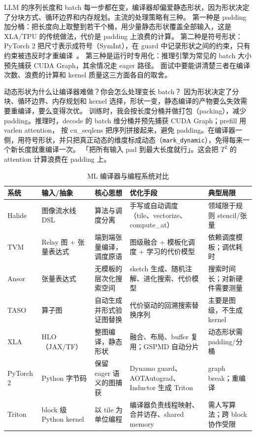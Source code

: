 LLM 的序列长度和 batch 每一步都在变，编译器却偏爱静态形状，因为形状决定了分块方式、循环边界和内存规划。主流的处理策略有三种。
第一种是 padding 加分桶：把长度向上取整到若干个桶，用少量静态形状覆盖全部输入，这是 XLA/TPU 的传统做法，代价是 padding 上浪费的计算。
第二种是符号形状：PyTorch 2 把尺寸表示成符号（SymInt），在 guard 中记录形状之间的约束，只有约束被违反时才重编译~\cite{ansel2024pytorch2}。
第三种是运行时专用化：推理引擎为常见的 batch 大小预先捕获 CUDA Graph，其余情况走 eager 路径。
面试中要能讲清楚三者在编译次数、浪费的计算和 kernel 质量这三方面各自的取舍。

\begin{qa}{动态形状为什么让编译器难做？你会怎么处理变长 batch？}
\ans 因为形状决定了分块、循环边界、内存规划和 kernel 选择，形状一变，静态编译的产物要么失效需要重编译，要么变得次优。
训练时，我会按长度分桶并做打包（packing），减少 padding。推理时，decode 的 batch 维分桶并预先捕获 CUDA Graph；prefill 用 varlen attention，
按 cu\_seqlens 把序列拼接起来，避免 padding。在编译器一侧，用符号形状，并只把真正动态的维度标成动态（\texttt{mark\_dynamic}），免得每来一个新长度就重编译一次。
\wrong 「把所有输入 pad 到最大长度就行」。这会把 $T^2$ 的 attention 计算浪费在 padding 上。
\end{qa}

\begin{table}[!t]
\centering
\caption{ML 编译器与编程系统对比}
\label{tab:compilers}
\footnotesize
\begin{tabularx}{\textwidth}{@{}l L{2.6cm} L{3.2cm} Y Y@{}}
\toprule
系统 & 输入/抽象 & 核心思想 & 优化手段 & 典型局限 \\
\midrule
Halide~\cite{ragan2013halide} & 图像流水线 DSL & 算法与调度分离 & 手写或自动调度（tile、vectorize、compute\_at） & 领域限于规则 stencil/张量 \\
TVM~\cite{chen2018tvm} & Relay 图 + 张量表达式 & 端到端张量编译，调度原语 & 图级融合 + 模板化调度 + 学习的代价模型 & 依赖调度模板；调优耗时 \\
Ansor~\cite{zheng2020ansor} & 张量表达式 & 无模板的层次化搜索空间 & sketch 生成、随机注解、进化搜索、代价模型 & 搜索时间长；对新硬件需要测量 \\
TASO~\cite{jia2019taso} & 算子图 & 自动生成并形式验证图替换 & 代价驱动的回溯搜索替换序列 & 主要是图级，不生成 kernel \\
XLA~\cite{xla} & HLO（JAX/TF） & 整图编译，静态形状 & 融合、布局、buffer 复用；GSPMD 自动分片 & 动态形状需 padding/分桶 \\
PyTorch 2~\cite{ansel2024pytorch2} & Python 字节码 & 保留 eager 语义的图捕获 & Dynamo guard、AOTAutograd、Inductor 生成 Triton & graph break；重编译 \\
Triton~\cite{tillet2019triton} & block 级 Python kernel & 以 tile 为单位编程 & 编译器负责线程映射、合并访存、shared memory & 需人写算法；跨 block 协作受限 \\
\bottomrule
\end{tabularx}
\end{table}

